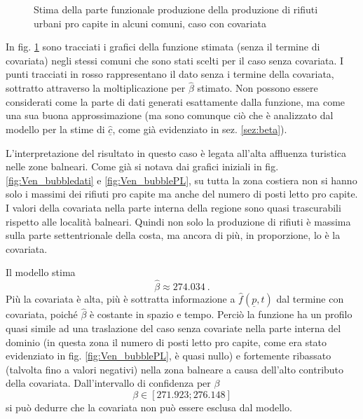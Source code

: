 \documentclass[a4paper,11pt,twoside,openright]{book}							%
\begin{document}
\begin{figure}[t]
{   }
	\caption{Stima della parte funzionale produzione della produzione di rifiuti urbani pro capite in alcuni comuni, caso con covariata}
	\label{fig:Vencovar_tempo}
\end{figure}
\newpage
In fig. \ref{fig:Vencovar_tempo} sono tracciati i grafici della funzione stimata (senza il termine di covariata) negli stessi comuni che sono stati scelti per il caso senza covariata. I punti tracciati in rosso rappresentano il dato senza i termine della covariata, sottratto attraverso la moltiplicazione per $\hat{\beta}$ stimato. Non possono essere considerati come la parte di dati generati esattamente dalla funzione, ma come una sua buona approssimazione (ma sono comunque ciò che è analizzato dal modello per la stime di $\hat{\underline{c}}$, come già evidenziato in sez. \ref{sez:beta}).

L'interpretazione del risultato in questo caso è legata all'alta affluenza turistica nelle zone balneari. Come già si notava dai grafici iniziali in fig. \ref{fig:Ven_bubbledati} e \ref{fig:Ven_bubblePL}, su tutta la zona costiera non si hanno solo i massimi dei rifiuti pro capite ma anche del numero di posti letto pro capite. I valori della covariata nella parte interna della regione sono quasi trascurabili rispetto alle località balneari. Quindi non solo la produzione di rifiuti è massima sulla parte settentrionale della costa, ma ancora di più, in proporzione, lo è la covariata.

Il modello stima
$$
\hat{\beta}\approx274.034 \ .
$$
Più la covariata è alta, più è sottratta informazione a $\hat{f}(\underline p,t)$ dal termine con covariata, poiché $\hat{\beta}$ è costante in spazio e tempo. Perciò la funzione ha un profilo quasi simile ad una traslazione del caso senza covariate nella parte interna del dominio (in questa zona il numero di posti letto pro capite, come era stato evidenziato in fig. \ref{fig:Ven_bubblePL}, è quasi nullo) e fortemente ribassato (talvolta fino a valori negativi) nella zona balneare a causa dell'alto contributo della covariata. Dall'intervallo di confidenza per $\beta$
$$
\beta \in [271.923;276.148]
$$
si può dedurre che la covariata non può essere esclusa dal modello.
\end{document}
